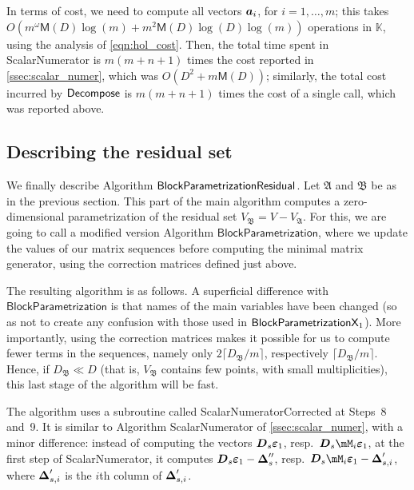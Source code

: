 \documentclass[12pt]{article}
\newcommand{\mat}[1]{\bm{\MakeUppercase{#1}}} %
\newcommand{\row}[1]{\bm{\MakeLowercase{#1}}} %
\newcommand{\col}[1]{\bm{\MakeLowercase{#1}}} %
\newcommand{\mainalgoname}{\mathsf{ BlockParametrization}}
\def\M {\ensuremath{\mathsf{M}}}
\def\K{\mathbb{K}}
\def\K {\ensuremath{\mathbb{K}}}
\begin{document}
In terms of cost, we need to compute all vectors $\row{a}_i$, for
$i=1,\dots,m$; this takes $ O(m^{\omega} \M(D) \log(m) + m^2
\M(D)\log(D)\log(m))$ operations in $\K$, using the analysis of
\cref{eqn:hol_cost}. Then, the total time spent in {\sf
  ScalarNumerator} is $m(m+n+1)$ times the cost reported in
\cref{ssec:scalar_numer}, which was $O(D^2 + m\M(D))$; similarly, the
total cost incurred by ${\sf Decompose}$ is $m(m+n+1)$ times the cost of
a single call, which was reported above.


\subsection{Describing the residual set}
 
We finally describe Algorithm $\mainalgoname{\sf Residual}$.  Let
$\mathfrak{A}$ and $\mathfrak{B}$ be as in the previous section.  This
part of the main algorithm computes a zero-dimensional parametrization
of the residual set $V_\mathfrak{B}=V-V_\mathfrak{A}$. For this, we
are going to call a modified version Algorithm
$\mathsf{BlockParametrization}$, where we update the values of our
matrix sequences before computing the minimal matrix generator, using
the correction matrices defined just above.

The resulting algorithm is as follows. A superficial difference with
$\mathsf{BlockParametrization}$ is that names of the main variables
have been changed (so as not to create any confusion with those used
in $\mainalgoname{\sf X}_1$). More importantly, using the correction
matrices makes it possible for us to compute fewer terms in the
sequences, namely only $2\lceil D_\mathfrak{B}/m\rceil$, respectively
$\lceil D_\mathfrak{B}/m\rceil$. Hence, if $D_\mathfrak{B} \ll D$
(that is, $V_\mathfrak{B}$ contains few points, with small
multiplicities), this last stage of the algorithm will be fast.

The algorithm uses a subroutine called {\sf ScalarNumeratorCorrected}
at Steps~8 and~9.  It is similar to Algorithm {\sf ScalarNumerator} of
\cref{ssec:scalar_numer}, with a minor difference: instead of computing the
vectors $\mat{D}_s \col{\varepsilon}_1$, resp.\ $\mat{D}_s\mM_i
\col{\varepsilon}_1$, at the first step of  {\sf ScalarNumerator}, it computes $\mat{D}_s
\col{\varepsilon}_1-\mat{\Delta}''_s$, resp.\ $\mat{D}_s\mM_i
\col{\varepsilon}_1-\mat{\Delta}'_{s,i}$, where $\mat{\Delta}'_{s,i}$
is the $i$th column of $\mat{\Delta}'_{s,i}$.
\end{document}
